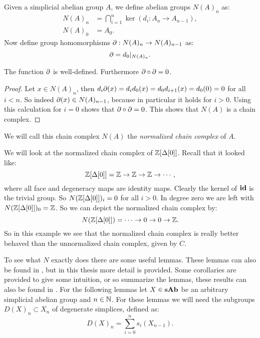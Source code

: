 Given a simplicial abelian group $A$, we define abelian groups $N(A)_n$ as:
\begin{align*}
	N(A)_n &= \bigcap_{i=1}^{n} \ker(d_i : A_n \to A_{n-1}), \\
	N(A)_0 &= A_0.
\end{align*}
Now define group homomorphisms $\partial : N(A)_n \to N(A)_{n-1}$ as:
$$ \partial = d_0|_{N(A)_n}. $$
\begin{lemma}
	The function $ \partial $ is well-defined. Furthermore $ \partial \circ \partial = 0 $.
\end{lemma}
\begin{proof}
	Let $x \in N(A)_n$, then $d_i \partial(x) = d_i d_0(x) = d_0 d_{i+1}(x) = d_0 (0) = 0$ for all $i < n$. So indeed $\partial(x) \in N(A)_{n-1}$, because in particular it holds for $i > 0$. Using this calculation for $i = 0$ shows that $\partial \circ \partial = 0$. This shows that $N(A)$ is a chain complex.
\end{proof}

We will call this chain complex $N(A)$ the \emph{normalized chain complex} of $A$.

\begin{example}
	We will look at the normalized chain complex of $\mathbb{Z}[\Delta[0]]$. Recall that it looked like:
	$$ \mathbb{Z}[\Delta[0]] = \mathbb{Z} \to \mathbb{Z} \to \mathbb{Z} \to \cdots, $$
	where all face and degeneracy maps are identity maps. Clearly the kernel of $\mathbf{id}$ is the trivial group. So $N(\mathbb{Z}[\Delta[0]])_i = 0$ for all $i > 0$. In degree zero we are left with $N(\mathbb{Z}[\Delta[0]])_0 = \mathbb{Z}$. So we can depict the normalized chain complex by:
	$$ N(\mathbb{Z}[\Delta[0]]) = \cdots \to 0 \to 0 \to \mathbb{Z}. $$
	So in this example we see that the normalized chain complex is really better behaved than the unnormalized chain complex, given by $C$.
\end{example}

To see what $N$ exactly does there are some useful lemmas. These lemmas can also be found in \cite[Chapter~VIII~1-2]{lamotke}, but in this thesis more detail is provided. Some corollaries are provided to give some intuition, or so summarize the lemmas, these results can also be found in \cite[Chapter~8.2-4]{weibel}. For the following lemmas let $X \in \mathbf{sAb}$ be an arbitrary simplicial abelian group and $n \in \mathbb{N}$. For these lemmas we will need the subgroups $D(X)_n \subset X_n$ of degenerate simplices, defined as:
$$ D(X)_n = \sum_{i=0}^n s_i(X_{n-1}). $$

